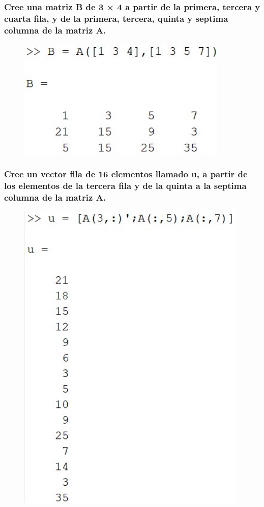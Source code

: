 \documentclass{article}
\begin{document}
\subsubsection{Cree una matriz B de 3 × 4 a partir de la primera, tercera y cuarta fila, y de la primera, tercera, quinta y septima columna de la matriz A.}
\begin{figure}[H]
    \centering
    \includegraphics[width = 10cm]{img8a.jpg}
\end{figure}
\subsubsection{Cree un vector fila de 16 elementos llamado u, a partir de los elementos de la tercera fila y de la quinta a la septima columna de la matriz A.}
\begin{figure}[H]
    \centering
    \includegraphics[width = 11cm]{img8b.jpg}
\end{figure}
\end{document}
